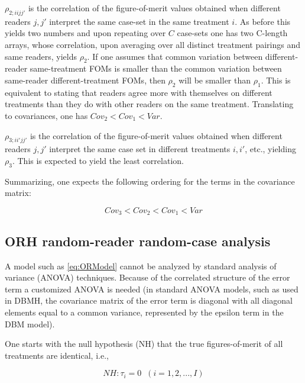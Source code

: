 \documentclass[
]{book}
\begin{document}
\(\rho_{2;iijj'}\) is the correlation of the figure-of-merit values obtained when different readers \(j,j'\) interpret the same case-set in the same treatment \(i\). As before this yields two numbers and upon repeating over \(C\) case-sets one has two C-length arrays, whose correlation, upon averaging over all distinct treatment pairings and same readers, yields \(\rho_2\). If one assumes that common variation between different-reader same-treatment FOMs is smaller than the common variation between same-reader different-treatment FOMs, then \(\rho_2\) will be smaller than \(\rho_1\). This is equivalent to stating that readers agree more with themselves on different treatments than they do with other readers on the same treatment. Translating to covariances, one has \(Cov_2 < Cov_1 < Var\).

\(\rho_{3;ii'jj'}\) is the correlation of the figure-of-merit values obtained when different readers \(j,j'\) interpret the same case set in different treatments \(i,i'\), etc., yielding \(\rho_3\). This is expected to yield the least correlation.

Summarizing, one expects the following ordering for the terms in the covariance matrix:

\begin{equation}
Cov_3 < Cov_2 < Cov_1 < Var
\label{eq:CovOrderings}
\end{equation}

\hypertarget{orh-random-reader-random-case-analysis}{%
\subsection{ORH random-reader random-case analysis}\label{orh-random-reader-random-case-analysis}}

A model such as \eqref{eq:ORModel} cannot be analyzed by standard analysis of variance (ANOVA) techniques. Because of the correlated structure of the error term a customized ANOVA is needed (in standard ANOVA models, such as used in DBMH, the covariance matrix of the error term is diagonal with all diagonal elements equal to a common variance, represented by the epsilon term in the DBM model).

One starts with the null hypothesis (NH) that the true figures-of-merit of all treatments are identical, i.e.,

\begin{equation}
NH:\tau_i=0\;\; (i=1,2,...,I)
\label{eq:ORModelNH}
\end{equation}
\end{document}
